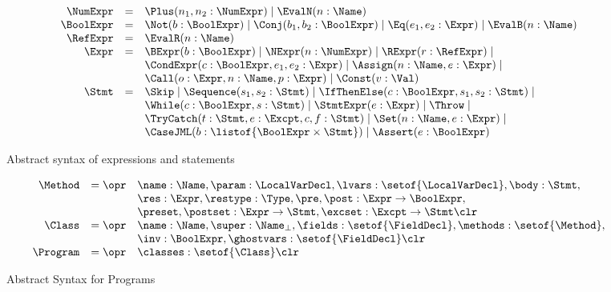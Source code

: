 \begin{figure}[t]
\[
\begin{array}{rcl}
\NumExpr & = & \Plus(n_1, n_2 : \NumExpr) \mid \EvalN(n : \Name) \\
\BoolExpr & = & \Not(b : \BoolExpr) \mid \Conj(b_1,
b_2 : \BoolExpr) \mid \Eq(e_1, e_2 : \Expr) \mid \EvalB(n : \Name) \\
\RefExpr & = & \EvalR(n : \Name)\\
\Expr & = & \BExpr(b : \BoolExpr) \mid
            \NExpr(n : \NumExpr) \mid
            \RExpr(r : \RefExpr) \mid\\
      &   & \CondExpr(c : \BoolExpr, e_1, e_2 : \Expr) \mid
            \Assign(n : \Name, e : \Expr) \mid \\
      &   & \Call(o : \Expr, n : \Name, p : \Expr) \mid 
            \Const(v : \Val) \\
\Stmt & = & \Skip \mid
            \Sequence(s_1, s_2 : \Stmt) \mid
            \IfThenElse(c : \BoolExpr, s_1, s_2 : \Stmt) \mid\\
      &   & \While(c : \BoolExpr, s : \Stmt) \mid
            \StmtExpr(e : \Expr) \mid
            \Throw \mid\\
      &   & \TryCatch(t: \Stmt, e : \Excpt, c, f : \Stmt) \mid
            \Set(n : \Name, e : \Expr) \mid\\
      &   & \CaseJML(b : \listof{\BoolExpr \times \Stmt}) \mid 
            \Assert(e : \BoolExpr) 
\end{array}
\]
\caption{Abstract syntax of expressions and
statements}\label{FigExprStmt}
\end{figure}

\begin{figure}[t]
\[
\begin{array}{rcl}
\Method & = \opr & \name : \Name, 
                   \param : \LocalVarDecl, 
                   \lvars : \setof{\LocalVarDecl},
                   \body : \Stmt,\\
        &        & \res : \Expr,
                   \restype : \Type,
                   \pre, \post : \Expr \rightarrow \BoolExpr, \\
        &        & \preset, \postset : \Expr \rightarrow \Stmt,
                   \excset : \Excpt \rightarrow \Stmt \clr \\
\Class & = \opr & \name : \Name,
                  \super : \Name_{\bot},
                  \fields : \setof{\FieldDecl},
                  \methods : \setof{\Method},\\
        &       & \inv : \BoolExpr,
                  \ghostvars : \setof{\FieldDecl} \clr\\
\Program & = \opr & \classes : \setof{\Class} \clr
\end{array}
\]
\caption{Abstract Syntax for Programs}\label{FigProgram}
\end{figure}

